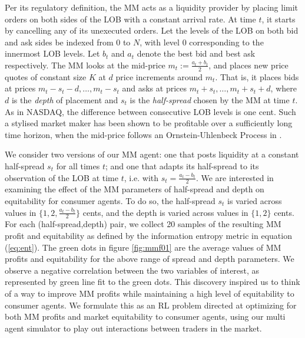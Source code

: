 \documentclass[sigconf]{acmart}
\begin{document}
Per its regulatory definition, the MM acts as a liquidity provider by placing limit orders on both sides of the LOB with a constant arrival rate. At time $t$, it starts by cancelling any of its unexecuted orders. Let the levels of the LOB on both bid and ask sides be indexed from $0$ to $N$, with level $0$ corresponding to the innermost LOB levels. Let $b_t$ and $a_t$ denote the best bid and best ask respectively. The MM looks at the mid-price $m_t:=\frac{a_t + b_t}{2}$, and places new price quotes of constant size $K$ at $d$ price increments around $m_t$. That is, it places bids at prices $m_t-s_t-d, \ldots, m_t-s_t$ and asks at prices $m_t + s_t, \ldots, m_t + s_t +d$, where $d$ is the {\it{depth}} of placement and $s_t$ is the {\it{half-spread}} chosen by the MM at time $t$. As in NASDAQ, the difference between consecutive LOB levels is one cent. Such a stylised market maker has been shown to be profitable over a sufficiently long time horizon, when the mid-price follows an  Ornstein-Uhlenbeck Process in \cite{chakraborty2011market}.

We consider two versions of our MM agent: one that posts liquidity at a constant half-spread $s_t$ for all times $t$; and one that adapts its half-spread to its observation of the LOB at time $t$, i.e. with $s_t = \frac{a_t-b_t}{2}$. We are interested in examining the effect of the MM parameters of half-spread and depth on equitability for consumer agents. To do so, the half-spread $s_t$ is varied across values in $\lbrace1,2,\frac{a_t-b_t}{2}\rbrace$ cents, and the depth is varied across values in $\lbrace1,2\rbrace$ cents. For each (half-spread,depth) pair, we collect 20 samples of the resulting MM profit and equitability as defined by the information entropy metric in equation (\ref{eq:ent}). The green dots in figure \ref{fig:mmf01} are the average values of MM profits and equitability for the above range of spread and depth parameters. We observe a negative correlation between the two variables of interest, as represented by green line fit to the green dots. This discovery inspired us to think of a way to improve MM profits while maintaining a high level of equitability to consumer agents. We formulate this as an RL problem directed at optimizing for both MM profits and market equitability to consumer agents, using our multi agent simulator to play out interactions between traders in the market.
\end{document}

